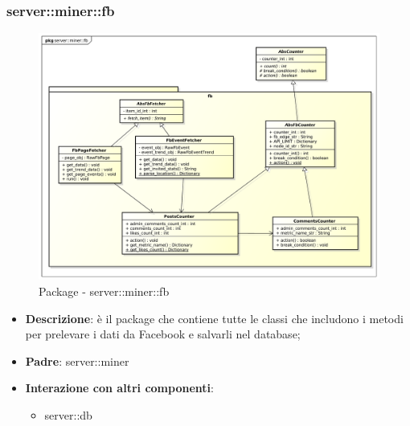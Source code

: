 \subsubsection{server::miner::fb} %
\label{ssub:bdsm_app_server_miner_fb}
\begin{figure}[htbp]
	\centering
	\centerline{\includegraphics[scale=0.4]{./images/server/miner_fb.pdf}}
	\caption{Package - server::miner::fb}
\end{figure}

\begin{itemize}
  \item \textbf{Descrizione}: è il package che contiene tutte le classi che includono i metodi per prelevare i dati da Facebook e salvarli nel database;
  \item \textbf{Padre}: server::miner
  \item \textbf{Interazione con altri componenti}:
  	\begin{itemize}
  		\item server::db
  	\end{itemize}
\end{itemize}

